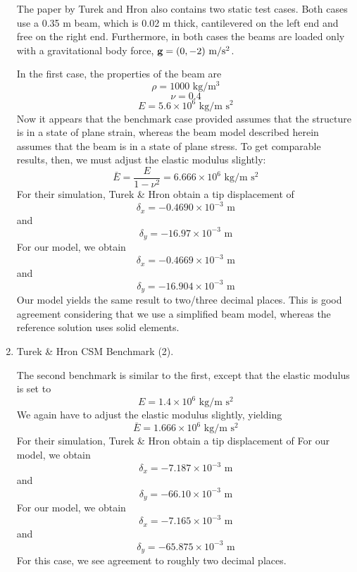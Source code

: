 \documentclass{article}
\begin{document}
\begin{enumerate}
The paper by Turek and Hron \cite{TurekHron2006} also contains two static test cases.  
Both cases use a 0.35 m beam, which is 0.02 m thick, cantilevered on the left end and free on the right end.
Furthermore, in both cases the beams are loaded only with a gravitational body force, ${\bf g} = (0,-2) \ \mbox{m/s$^2$}$.

In the first case, the properties of the beam are
\[ \rho = 1000 \mbox{ kg/m$^3$} \]
\[ \nu = 0.4 \]
\[ E = 5.6 \times 10^6 \mbox{ kg/m s$^2$} \]
Now it appears that the benchmark case provided assumes that the structure is in a state of plane strain, whereas the beam model described herein assumes that the beam is in a state of plane stress. 
To get comparable results, then, we must adjust the elastic modulus slightly:
\[ \bar{E} = \frac{E}{1-\nu^2} = 6.666 \times 10^6 \mbox{ kg/m s$^2$} \]
For their simulation, Turek \& Hron obtain a tip displacement of 
\[ \delta_x = -0.4690 \times 10^{-3} \mbox{ m} \]
and 
\[ \delta_y = -16.97 \times 10^{-3} \mbox{ m} \]
For our model, we obtain
\[ \delta_x = -0.4669 \times 10^{-3} \mbox{ m} \]
and 
\[ \delta_y = -16.904 \times 10^{-3} \mbox{ m} \]
Our model yields the same result to two/three decimal places.
This is good agreement considering that we use a simplified beam model, whereas the reference solution uses solid elements.

\item Turek \& Hron CSM Benchmark (2).

The second benchmark is similar to the first, except that the elastic modulus is set to
\[ E = 1.4 \times 10^6 \mbox{ kg/m s$^2$} \]
We again have to adjust the elastic modulus slightly, yielding
\[ \bar{E} = 1.666 \times 10^6 \mbox{ kg/m s$^2$} \]
For their simulation, Turek \& Hron obtain a tip displacement of 
For our model, we obtain
\[ \delta_x = -7.187 \times 10^{-3} \mbox{ m} \]
and 
\[ \delta_y = -66.10 \times 10^{-3} \mbox{ m} \]
For our model, we obtain
\[ \delta_x = -7.165 \times 10^{-3} \mbox{ m} \]
and 
\[ \delta_y = -65.875 \times 10^{-3} \mbox{ m} \]
For this case, we see agreement to roughly two decimal places.

\end{enumerate}
\end{document}
